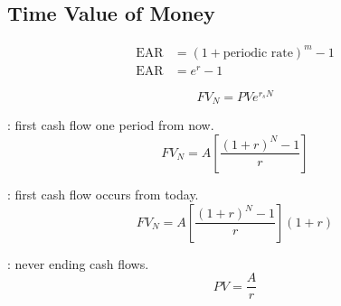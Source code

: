 \subsection{Time Value of Money}

\begin{definition}
\begin{align}
\text{EAR} &= (1 + \text{periodic rate})^m - 1 \nonumber \\
\text{EAR} &= e^r - 1 \nonumber
\end{align}
\end{definition}

\begin{definition}
\begin{equation}
FV_N = PV e^{r_s N} \nonumber
\end{equation}
\end{definition}

\begin{definition}
: first cash flow one period from now.
\begin{equation}
FV_N = A \left[ \frac{(1+r)^N - 1}{r} \right] \nonumber
\end{equation}
\end{definition}

\begin{definition}
: first cash flow occurs from today.
\begin{equation}
FV_N = A \left[ \frac{(1+r)^N - 1}{r} \right] (1+r) \nonumber
\end{equation}
\end{definition}

\begin{definition}
: never ending cash flows.
\begin{equation}
PV = \frac{A}{r} \nonumber
\end{equation}
\end{definition}



